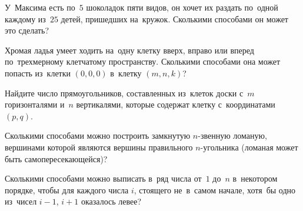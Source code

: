 \begin{problems}
\item
У~Максима есть по~$5$ шоколадок пяти видов, он хочет их раздать по~одной
каждому из~$25$ детей, пришедших на~кружок.
Сколькими способами он может это сделать?

\item
Хромая ладья умеет ходить на~одну клетку вверх, вправо или вперед
по~трехмерному клетчатому пространству.
Сколькими способами она может попасть из~клетки $(0, 0, 0)$ в~клетку
$(m, n, k)$?

\item
Найдите число прямоугольников, составленных из~клеток доски с~$m$ горизонталями
и~$n$ вертикалями, которые содержат клетку с~координатами $(p, q)$.

\item
Сколькими способами можно построить замкнутую $n$-звенную ломаную, вершинами
которой являются вершины правильного $n$-угольника
(ломаная может быть самопересекающейся)?

\item
Сколькими способами можно выписать в~ряд числа от~$1$ до~$n$ в~некотором
порядке, чтобы для каждого числа $i$, стоящего не~в~самом начале, хотя~бы одно
из~чисел $i - 1$, $i + 1$ оказалось левее?

\end{problems}

